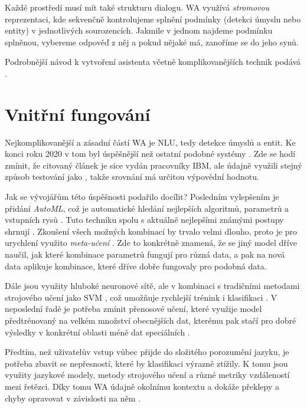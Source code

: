 Každé prostředí musí mít také strukturu dialogu.
WA využívá \textit{stromovou} reprezentaci,
kde sekvenčně kontrolujeme splnění podmínky (detekci úmyslu nebo entity) v
jednotlivých sourozencích. Jakmile v jednom najdeme podmínku splněnou, vybereme
odpověď z něj a pokud nějaké má, zanoříme se do jeho synů.

Podrobnější návod k vytvoření asistenta včetně komplikovanějších
technik podává \citet{akbulut_common_2020}.

\section{Vnitřní fungování}\label{wa-inside}

Nejkomplikovanější a zásadní částí WA je NLU, tedy detekce úmyslů
a entit. Ke konci roku 2020 v tom byl úspěšnější než ostatní podobné
systémy \citep{qi2021benchmarking}. Zde se hodí zmínit,
že citovaný článek je sice vydán pracovníky IBM, ale údajně využili
stejný způsob testování jako \citet{arora-etal-2020-hint3}, takže
srovnání má určitou výpovědní hodnotu.

Jak se vývojářům této úspěšnosti podařilo docílit? Posledním vylepšením
je přidání \textit{AutoML}, což je automatické hledání nejlepších algoritmů,
parametrů a vstupních rysů \citep{noauthor_watson_2020}. Tuto techniku
spolu s aktuálně nejlepšími známými postupy shrnují \citet[duben]{He_2021}.
Zkoušení všech
možných kombinací by trvalo velmi dlouho, proto je pro urychlení
využito \textit{meta-učení} \citep{hospedales2020metalearning}.
Zde to konkrétně znamená, že se jiný model dříve naučil, jak které
kombinace parametrů fungují pro
různá data, a pak na nová data aplikuje kombinace, které dříve dobře
fungovaly pro podobná data.

Dále jsou využity hluboké neuronové sítě, ale v kombinaci s tradičními
metodami strojového učení jako SVM \citep{bosertraining}, což umožňuje
rychlejší trénink i klasifikaci \citep{potdar_watson_2021}. V neposlední
řadě je potřeba zmínit přenosové učení, které využije model předtrénovaný
na velkém množství obecnějších dat, kterému pak stačí pro dobré výsledky
v konkrétní oblasti méně dat speciálních \citep{zhuang2020comprehensive}.

Předtím, než uživatelův vstup vůbec přijde do složitého porozumění jazyku,
je potřeba zbavit se nepřesností, které by klasifikaci výrazně ztížily.
K tomu jsou využity jazykové modely, metody strojového učení a
různé metriky vzdáleností mezi řetězci. Díky tomu WA údajně 
okolnímu kontextu a dokáže překlepy a chyby opravovat v závislosti
na něm \citep{mason_ahnouncing_2019}.